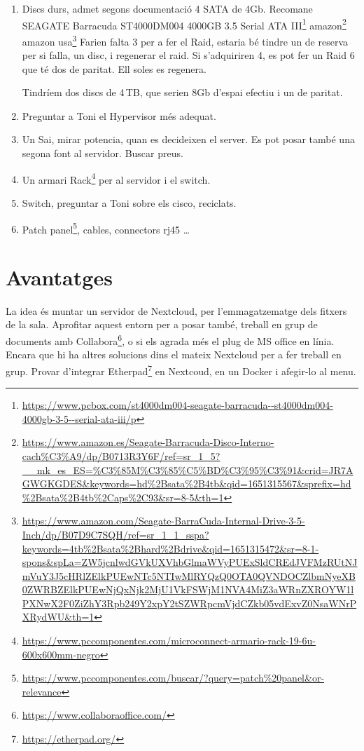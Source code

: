 \documentclass[
  10pt,
]{krantz}
\DeclareRobustCommand{\href}[2]{#2\footnote{\url{#1}}}
\begin{document}
\begin{enumerate}
\def\labelenumi{\arabic{enumi}.}
\setcounter{enumi}{1}
\item
  Discs durs, admet segons documentació 4 SATA de 4Gb. Recomane \href{https://www.pcbox.com/st4000dm004-seagate-barracuda--st4000dm004-4000gb-3-5--serial-ata-iii/p}{SEAGATE Barracuda ST4000DM004 4000GB 3.5 Serial ATA III} \href{https://www.amazon.es/Seagate-Barracuda-Disco-Interno-cach\%C3\%A9/dp/B0713R3Y6F/ref=sr_1_5?__mk_es_ES=\%C3\%85M\%C3\%85\%C5\%BD\%C3\%95\%C3\%91\&crid=JR7AGWGKGDES\&keywords=hd\%2Bsata\%2B4tb\&qid=1651315567\&sprefix=hd\%2Bsata\%2B4tb\%2Caps\%2C93\&sr=8-5\&th=1}{amazon} \href{https://www.amazon.com/Seagate-BarraCuda-Internal-Drive-3-5-Inch/dp/B07D9C7SQH/ref=sr_1_1_sspa?keywords=4tb\%2Bsata\%2Bhard\%2Bdrive\&qid=1651315472\&sr=8-1-spons\&spLa=ZW5jcnlwdGVkUXVhbGlmaWVyPUExSldCREdJVFMzRUtNJmVuY3J5cHRlZElkPUEwNTc5NTIwMlRYQzQ0OTA0QVNDOCZlbmNyeXB0ZWRBZElkPUEwNjQxNjk2MjU1VkFSWjM1NVA4MiZ3aWRnZXROYW1lPXNwX2F0ZiZhY3Rpb249Y2xpY2tSZWRpcmVjdCZkb05vdExvZ0NsaWNrPXRydWU\&th=1}{amazon usa} Farien falta 3 per a fer el Raid, estaria bé tindre un de reserva per si falla, un disc, i regenerar el raid. Si s'adquiriren 4, es pot fer un Raid 6 que té dos de paritat. Ell soles es regenera.

  Tindríem dos discs de 4\,TB, que serien 8Gb d'espai efectiu i un de paritat.
\item
  Preguntar a Toni el Hypervisor més adequat.
\item
  Un Sai, mirar potencia, quan es decideixen el server. Es pot posar també una segona font al servidor. Buscar preus.
\item
  Un armari \href{https://www.pccomponentes.com/microconnect-armario-rack-19-6u-600x600mm-negro}{Rack} per al servidor i el switch.
\item
  Switch, preguntar a Toni sobre els cisco, reciclats.
\item
  \href{https://www.pccomponentes.com/buscar/?query=patch\%20panel\&or-relevance}{Patch panel}, cables, connectors rj45 \ldots{}
\end{enumerate}

\hypertarget{avantatges}{%
\section{Avantatges}\label{avantatges}}

La idea és muntar un servidor de Nextcloud, per l'emmagatzematge dels fitxers de la sala. Aprofitar aquest entorn per a posar també, treball en grup de documents amb \href{https://www.collaboraoffice.com/}{Collabora}, o si els agrada més el plug de MS office en línia. Encara que hi ha altres solucions dins el mateix Nextcloud per a fer treball en grup. Provar d'integrar \href{https://etherpad.org/}{Etherpad} en Nextcoud, en un Docker i afegir-lo al menu.
\end{document}
